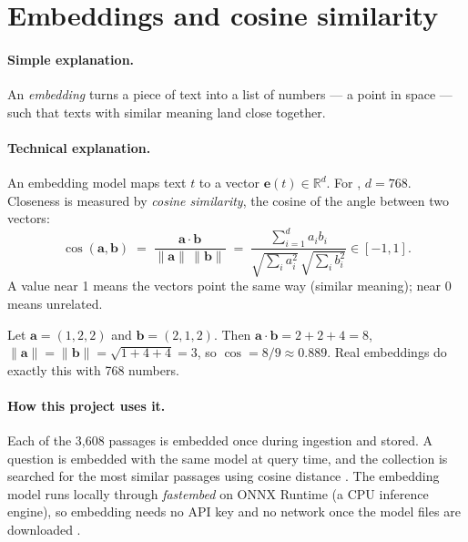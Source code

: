 \section{Embeddings and cosine similarity}
\label{sec:embeddings}

\paragraph{Simple explanation.} An \emph{embedding} turns a piece of text into a list of numbers --- a point in space --- such that texts with similar meaning land close together.

\paragraph{Technical explanation.} An embedding model maps text $t$ to a vector $\mathbf{e}(t)\in\mathbb{R}^{d}$. For , $d=768$. Closeness is measured by \emph{cosine similarity}, the cosine of the angle between two vectors:
\begin{equation}
\cos(\mathbf{a},\mathbf{b}) \;=\; \frac{\mathbf{a}\cdot\mathbf{b}}{\lVert\mathbf{a}\rVert\,\lVert\mathbf{b}\rVert}
\;=\; \frac{\sum_{i=1}^{d} a_i b_i}{\sqrt{\sum_i a_i^2}\,\sqrt{\sum_i b_i^2}} \in [-1, 1].
\end{equation}
A value near 1 means the vectors point the same way (similar meaning); near 0 means unrelated.

\begin{example}
Let $\mathbf{a}=(1,2,2)$ and $\mathbf{b}=(2,1,2)$. Then $\mathbf{a}\cdot\mathbf{b}=2+2+4=8$, $\lVert\mathbf{a}\rVert=\lVert\mathbf{b}\rVert=\sqrt{1+4+4}=3$, so $\cos=8/9\approx0.889$. Real embeddings do exactly this with 768 numbers.
\end{example}

\paragraph{How this project uses it.} Each of the 3,608 passages is embedded once during ingestion and stored. A question is embedded with the same model at query time, and the collection is searched for the most similar passages using cosine distance . The embedding model runs locally through \emph{fastembed} on ONNX Runtime (a CPU inference engine), so embedding needs no API key and no network once the model files are downloaded .

